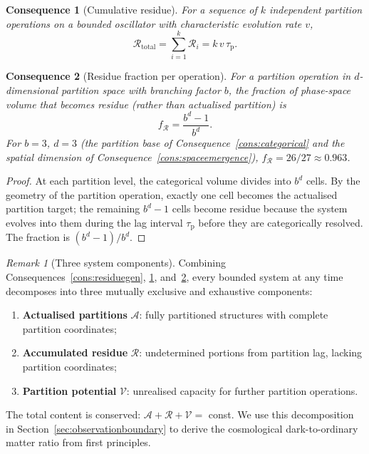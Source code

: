\documentclass[11pt,twocolumn,a4paper]{article}
\theoremstyle{axiomstyle}
\theoremstyle{conseqstyle}
\newtheorem{consequence}{Consequence}
\theoremstyle{definition}
\theoremstyle{remark}
\newtheorem*{remark}{Remark}
\newcommand{\taup}{\tau_{\mathrm{p}}}
\newcommand{\Residue}{\mathcal{R}}
\newcommand{\Potential}{\mathcal{V}}
\begin{document}
\begin{consequence}[Cumulative residue]\label{cons:cumulativeresidue}
For a sequence of $k$ independent partition operations on a bounded oscillator with characteristic evolution rate $v$,
\begin{equation}
\Residue_{\mathrm{total}}=\sum_{i=1}^{k}\Residue_{i}=k\,v\,\taup.
\end{equation}
\end{consequence}

\begin{consequence}[Residue fraction per operation]\label{cons:residuefraction}
For a partition operation in $d$-dimensional partition space with branching factor $b$, the fraction of phase-space volume that becomes residue (rather than actualised partition) is
\begin{equation}
f_{\Residue}=\frac{b^{d}-1}{b^{d}}.
\end{equation}
For $b=3$, $d=3$ (the partition base of Consequence~\ref{cons:categorical} and the spatial dimension of Consequence~\ref{cons:spaceemergence}), $f_{\Residue}=26/27\approx 0.963$.
\end{consequence}

\begin{proof}
At each partition level, the categorical volume divides into $b^{d}$ cells. By the geometry of the partition operation, exactly one cell becomes the actualised partition target; the remaining $b^{d}-1$ cells become residue because the system evolves into them during the lag interval $\taup$ before they are categorically resolved. The fraction is $(b^{d}-1)/b^{d}$.
\end{proof}

\begin{remark}[Three system components]
Combining Consequences~\ref{cons:residuegen}, \ref{cons:cumulativeresidue}, and~\ref{cons:residuefraction}, every bounded system at any time decomposes into three mutually exclusive and exhaustive components:
\begin{enumerate}[nosep,label=(\roman*)]
\item \textbf{Actualised partitions} $\mathcal{A}$: fully partitioned structures with complete partition coordinates;
\item \textbf{Accumulated residue} $\Residue$: undetermined portions from partition lag, lacking partition coordinates;
\item \textbf{Partition potential} $\Potential$: unrealised capacity for further partition operations.
\end{enumerate}
The total content is conserved: $\mathcal{A}+\Residue+\Potential=$ const. We use this decomposition in Section~\ref{sec:observationboundary} to derive the cosmological dark-to-ordinary matter ratio from first principles.
\end{remark}
\end{document}
